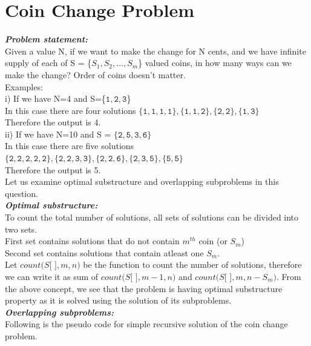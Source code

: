 \documentclass[12pt]{book}
\begin{document}
\chapter{Coin Change Problem}	
\textbf{\textit{Problem statement:}}\\
Given a value N, if we want to make the change for N cents, and we have infinite supply of each of S = \{$S_1, S_2, ..., S_m$\} valued coins, in how many ways can we make the change? Order of coins doesn’t matter.\\

Examples:\\

i) If we have N=4 and S=\{$\mathtt{1, 2, 3}$\}\\
In this case there are four solutions $\mathtt{\{1, 1, 1, 1\}, \{1, 1, 2\}, \{2, 2\}, \{1, 3\}}$\\
Therefore the output is 4.\\

ii) If we have N=10 and S = $\mathtt{\{2, 5, 3, 6\}}$\\
In this case there are five solutions $\mathtt{\{2, 2, 2, 2, 2\}, \{2, 2, 3, 3\}, \{2, 2, 6\}, \{2, 3, 5\}, \{5, 5\}}$\\
Therefore the output is 5.\\

Let us examine optimal substructure and overlapping subproblems in this question.\\

\textbf{\textit{Optimal substructure:}}\\
To count the total number of solutions, all sets of solutions can be divided into two sets.\\
First set contains solutions that do not contain $m^{th}$ coin (or $S_m$)\\
Second set contains solutions that contain atleast one $S_m$.\\
Let $count(S[$  $] ,m, n)$ be the function to count the number of solutions, therefore we can write it as sum of $count(S[$ $], m-1, n)$ and $count(S[$ $], m, n-S_m)$.
From the above concept, we see that the problem is having optimal substructure property as it is solved using the solution of its subproblems.\\

\textbf{\textit{Overlapping subproblems:}}\\
Following is the pseudo code for simple recursive solution of the coin change problem.\\
\end{document}
